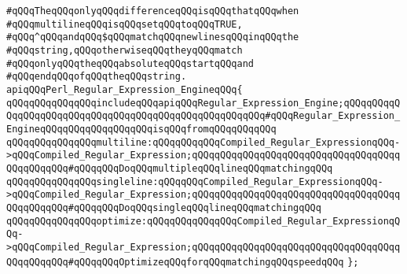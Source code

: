 \verb|#qQQqTheqQQqonlyqQQqdifferenceqQQqisqQQqthatqQQqwhen|\newline
\verb|#qQQqmultilineqQQqisqQQqsetqQQqtoqQQqTRUE,|\newline
\verb|#qQQq^qQQqandqQQq$qQQqmatchqQQqnewlinesqQQqinqQQqthe|\newline
\verb|#qQQqstring,qQQqotherwiseqQQqtheyqQQqmatch|\newline
\verb|#qQQqonlyqQQqtheqQQqabsoluteqQQqstartqQQqand|\newline
\verb|#qQQqendqQQqofqQQqtheqQQqstring.|\newline
\newline
\newline
\verb|apiqQQqPerl_Regular_Expression_EngineqQQq{|\newline
\newline
\verb|qQQqqQQqqQQqqQQqincludeqQQqapiqQQqRegular_Expression_Engine;qQQqqQQqqQQqqQQqqQQqqQQqqQQqqQQqqQQqqQQqqQQqqQQqqQQqqQQq#qQQqRegular_Expression_EngineqQQqqQQqqQQqqQQqqQQqisqQQqfromqQQqqQQqqQQq|\newline
\newline
\verb|qQQqqQQqqQQqqQQqmultiline:qQQqqQQqqQQqCompiled_Regular_ExpressionqQQq->qQQqCompiled_Regular_Expression;qQQqqQQqqQQqqQQqqQQqqQQqqQQqqQQqqQQqqQQqqQQqqQQq#qQQqqQQqDoqQQqmultipleqQQqlineqQQqmatchingqQQq|\newline
\verb|qQQqqQQqqQQqqQQqsingleline:qQQqqQQqCompiled_Regular_ExpressionqQQq->qQQqCompiled_Regular_Expression;qQQqqQQqqQQqqQQqqQQqqQQqqQQqqQQqqQQqqQQqqQQqqQQq#qQQqqQQqDoqQQqsingleqQQqlineqQQqmatchingqQQq|\newline
\verb|qQQqqQQqqQQqqQQqoptimize:qQQqqQQqqQQqqQQqCompiled_Regular_ExpressionqQQq->qQQqCompiled_Regular_Expression;qQQqqQQqqQQqqQQqqQQqqQQqqQQqqQQqqQQqqQQqqQQqqQQq#qQQqqQQqOptimizeqQQqforqQQqmatchingqQQqspeedqQQq|\newline
\verb|};|\newline

